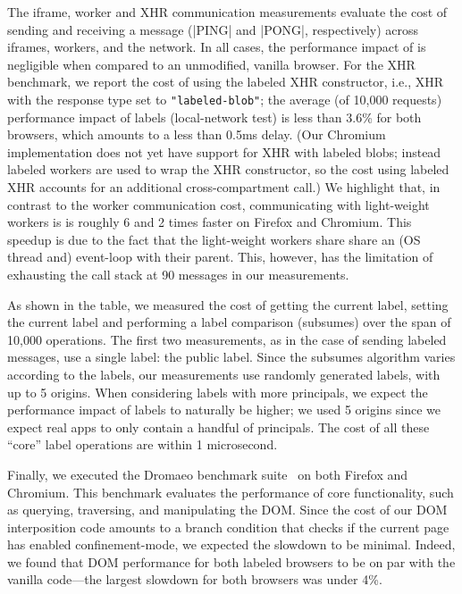 %
The iframe, worker and XHR communication measurements evaluate the
cost of sending and receiving a message (\js|PING| and \js|PONG|,
respectively) across iframes, workers, and the network.
%
In all cases, the performance impact of \sys{} is negligible when
compared to an unmodified, vanilla browser.
%
For the XHR benchmark, we report the cost of using the labeled XHR
constructor, i.e., XHR with the response type set to
\verb|"labeled-blob"|; the average (of 10,000 requests) performance
impact of labels (local-network test) is less than 3.6\% for both
browsers, which amounts to a less than 0.5ms delay.
%
(Our Chromium implementation does not yet have support for XHR with
labeled blobs; instead labeled workers are used to wrap the XHR
constructor, so the cost using labeled XHR accounts for an additional
cross-compartment call.)
%
We highlight that, in contrast to the worker communication cost,
communicating with light-weight workers is is roughly 6 and 2 times
faster on Firefox and Chromium.
%
This speedup is due to the fact that the light-weight workers share
share an (OS thread and) event-loop with their parent.
%
This, however, has the limitation of exhausting the call stack at 90
messages in our measurements.

As shown in the table, we measured the cost of getting the current
label, setting the current label and performing a label comparison
(subsumes) over the span of 10,000 operations.
%
The first two measurements, as in the case of sending labeled
messages, use a single label: the public label.  Since the subsumes
algorithm varies according to the labels, our measurements use
randomly generated labels, with up to 5 origins.
%
When considering labels with more principals, we expect the
performance impact of labels to naturally be higher; we used 5 origins
since we expect real apps to only contain a handful of principals.
%
The cost of all these ``core'' label operations are within
1 microsecond.

Finally, we executed the Dromaeo benchmark suite~\cite{dromaeo} on
both Firefox and Chromium.
%
This benchmark evaluates the performance of core functionality,
such as querying, traversing, and manipulating the DOM.
%
Since the cost of our DOM interposition code amounts to a branch
condition that checks if the current page has enabled
confinement-mode, we expected the slowdown to be minimal. Indeed, we
found that DOM performance for both labeled browsers to be on par with
the vanilla code---the largest slowdown for both browsers was under
4\%.




